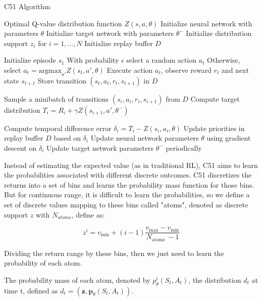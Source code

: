 \documentclass{article}
\begin{document}
\begin{algorithm}
\caption{C51 Algorithm}
\begin{algorithmic}[1]
    \Ensure Optimal Q-value distribution function $Z(s, a, \theta)$
    \State Initialize neural network with parameters $\theta$
    \State Initialize target network with parameters $\theta^{-}$
    \State Initialize distribution support $z_i$ for $i = 1, ..., N$
    \State Initialize replay buffer $D$

        \State Initialize episode $s_1$
            \State With probability $\epsilon$ select a random action $a_t$
            \State Otherwise, select $a_t = \text{argmax}_{a'} Z(s_t, a', \theta)$
            \State Execute action $a_t$, observe reward $r_t$ and next state $s_{t+1}$
            \State Store transition $(s_t, a_t, r_t, s_{t+1})$ in $D$

            \State Sample a minibatch of transitions $(s_i, a_i, r_i, s_{i+1})$ from $D$
            \State Compute target distribution $T_i = R_i + \gamma Z(s_{i+1}, a', \theta^{-})$

            \State Compute temporal difference error $\delta_i = T_i - Z(s_i, a_i, \theta)$
            \State Update priorities in replay buffer $D$ based on $\delta_i$
            \State Update neural network parameters $\theta$ using gradient descent on $\delta_i$
            \State Update target network parameters $\theta^{-}$ periodically
        \EndFor
    \EndFor
\end{algorithmic}
\end{algorithm}

Instead of estimating the expected value (as in traditional RL), C51 aims to learn the probabilities associated with different discrete outcomes.
C51 discretizes the returns into a set of bins and learns the probability mass function for those bins. But for continuous range, it is difficult to learn the probabilities, so we define a set of discrete values mapping to these bins called "atoms", denoted as discrete support $z$ with $N_{atoms}$, define as:

\begin{equation}
z^i=v_{\min }+(i-1) \frac{v_{\max }-v_{\min }}{N_{\text {atoms }}-1}
\end{equation}

Dividing the return range by these bins, then we just need to learn the probability of each atom.

The probability mass of each atom, denoted by $p_\theta^i\left(S_t, A_t\right)$, the distribution $d_t$ at time t, defined as $d_t=\left(\boldsymbol{z}, \boldsymbol{p}_\theta\left(S_t, A_t\right)\right).$
\end{document}
